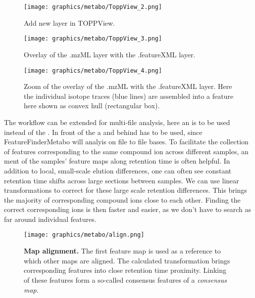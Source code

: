 \begin{figure}[htbp]
  \centering
  \texttt{[image: graphics/metabo/ToppView\_2.png]}
  \caption{Add new layer in TOPPView.}
  \label{fig:ToppView_2}
\end{figure}

\begin{figure}[htbp]
  \centering
  \texttt{[image: graphics/metabo/ToppView\_3.png]}
  \caption{Overlay of the .mzML layer with the .featureXML layer. }
  \label{fig:ToppView_3}
\end{figure}

\begin{figure}[htbp]
  \centering
  \texttt{[image: graphics/metabo/ToppView\_4.png]}
  \caption{Zoom of the overlay of the .mzML with the .featureXML layer. Here the individual isotope traces (blue lines) are assembled into a feature here shown as convex hull (rectangular box).}
  \label{fig:ToppView_4}
\end{figure}

The workflow can be extended for multi-file analysis, here an  is to be used instead of the .  In front of the  a  and behind  has to be used, since FeatureFinderMetabo will analyis on file to file bases. 
\newline
To facilitate the collection of features corresponding to the same compound ion across different samples, an 
ment of the samples' feature maps along retention time is often helpful. In addition to local, small-scale elution differences, one can often see constant retention time shifts across large sections between samples. We can use linear transformations to correct for these large scale retention differences. This  brings the majority of corresponding compound ions close to each other. Finding the correct corresponding ions is then faster and easier, as we don't have to search as far around individual features.

\begin{figure}[!htbp]
	\centering
	\texttt{[image: graphics/metabo/align.png]}
	\caption[Map alignment]
	{
	\textbf{Map alignment.} The first feature map is used as a reference to which other maps are aligned. The calculated transformation brings corresponding features into close retention time proximity. Linking of these features form a so-called consensus features of a \textit{consensus map}.
	}
	\label{bg_alignment}
\end{figure}

